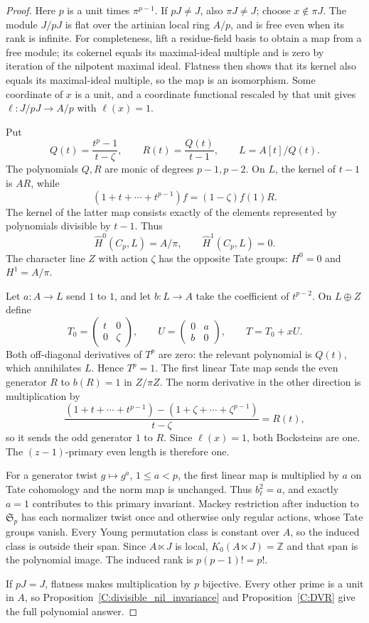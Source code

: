 \begin{proof}
Here $p$ is a unit times $\pi^{p-1}$. If $pJ\ne J$, also
$\pi J\ne J$; choose $x\notin\pi J$.
The module $J/pJ$ is flat over the artinian local ring $A/p$,
and is free even when its rank is infinite. For completeness,
lift a residue-field basis to obtain a map from a free module;
its cokernel equals its maximal-ideal multiple and is zero by
iteration of the nilpotent maximal ideal. Flatness then shows
that its kernel also equals its maximal-ideal multiple, so the
map is an isomorphism. Some coordinate of $x$ is a unit, and a
coordinate functional rescaled by that unit gives
$\ell:J/pJ\to A/p$ with $\ell(x)=1$.

Put
\[
 Q(t)=\frac{t^p-1}{t-\zeta},\qquad
 R(t)=\frac{Q(t)}{t-1},\qquad L=A[t]/Q(t).
\]
The polynomials $Q,R$ are monic of degrees $p-1,p-2$.
On $L$, the kernel of $t-1$ is $AR$, while
\[
 (1+t+\cdots+t^{p-1})f=(1-\zeta)f(1)R.
\]
The kernel of the latter map consists exactly of the elements
represented by polynomials divisible by $t-1$. Thus
\[
 \widehat H^0(C_p,L)=A/\pi,\qquad
 \widehat H^1(C_p,L)=0.
\]
The character line $Z$ with action $\zeta$ has the opposite
Tate groups: $H^0=0$ and $H^1=A/\pi$.

Let $a:A\to L$ send $1$ to $1$, and let $b:L\to A$ take the
coefficient of $t^{p-2}$. On $L\oplus Z$ define
\[
 T_0=\begin{pmatrix}t&0\\0&\zeta\end{pmatrix},\qquad
 U=\begin{pmatrix}0&a\\b&0\end{pmatrix},\qquad T=T_0+xU.
\]
Both off-diagonal derivatives of $T^p$ are zero: the relevant
polynomial is $Q(t)$, which annihilates $L$. Hence $T^p=1$.
The first linear Tate map sends the even generator $R$ to
$b(R)=1$ in $Z/\pi Z$. The norm derivative in the other direction
is multiplication by
\[
 \frac{(1+t+\cdots+t^{p-1})
             -(1+\zeta+\cdots+\zeta^{p-1})}{t-\zeta}
 =R(t),
\]
so it sends the odd generator $1$ to $R$. Since $\ell(x)=1$,
both Bocksteins are one. The $(z-1)$-primary even length is
therefore one.

For a generator twist $g\mapsto g^a$, $1\le a<p$, the first
linear map is multiplied by $a$ on Tate cohomology and the norm
map is unchanged. Thus $b_\ell^2=a$, and exactly $a=1$
contributes to this primary invariant. Mackey restriction after
induction to $\mathfrak S_p$ has each normalizer twist once and
otherwise only regular actions, whose Tate groups vanish.
Every Young permutation class is constant over $A$, so the
induced class is outside their span. Since $A\ltimes J$ is local,
$K_0(A\ltimes J)=\mathbb Z$ and that span is the polynomial image.
The induced rank is $p(p-1)!=p!$.

If $pJ=J$, flatness makes multiplication by $p$ bijective.
Every other prime is a unit in $A$, so
Proposition~\ref{C:divisible_nil_invariance} and
Proposition~\ref{C:DVR} give the full polynomial answer.
\end{proof}
